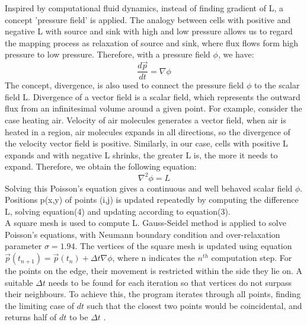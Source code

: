 \documentclass[10pt,two column]{configuration/unoesc}
\begin{document}
Inspired by computational fluid dynamics, instead of finding gradient of L, a concept 'pressure field' is applied. The analogy between cells with positive and negative L with source and sink with high and low pressure allows us to regard the mapping process as relaxation of source and sink, where flux flows form high pressure to low pressure. Therefore, with a pressure field $\phi$, we have:
\begin{equation}
    \frac{d\vec p}{dt} = \nabla \phi
\end{equation}
The concept, divergence, is also used to connect the pressure field $\phi$ to the scalar field L. Divergence of a vector field is a scalar field, which represents the outward flux from an infinitesimal volume around a given point. For example, consider the case heating air. Velocity of air molecules generates a vector field, when air is heated in a region, air molecules expands in all directions, so the divergence of the velocity vector field is positive. Similarly, in our case, cells with positive L expands and with negative L shrinks, the greater L is, the more it needs to expand. Therefore, we obtain the following equation:
\begin{equation}
    \nabla^{2} \phi = L
\end{equation}
Solving this Poisson's equation gives a continuous and well behaved scalar field $\phi$. Positions p(x,y) of points (i,j) is updated repeatedly by computing the difference L, solving equation(4) and updating according to equation(3).\\

A square mesh is used to compute L. Gauss-Seidel method is applied to solve Poisson's equations, with Neumann boundary condition and over-relaxation parameter $\sigma=1.94$. The vertices of the square mesh is updated using equation $\vec p(t_{n+1})=\vec p(t_n)+ \Delta t\nabla \phi$, where n indicates the $n^{th}$ computation step. For the points on the edge, their movement is restricted within the side they lie on. A suitable $\Delta t$ needs to be found for each iteration so that vertices do not surpass their neighbours. To achieve this, the program iterates through all points, finding the limiting case of $dt$ such that the closest two points would be coincidental, and returns half of $dt$ to be $\Delta t$ \cite{yue2014poisson}.
\end{document}
